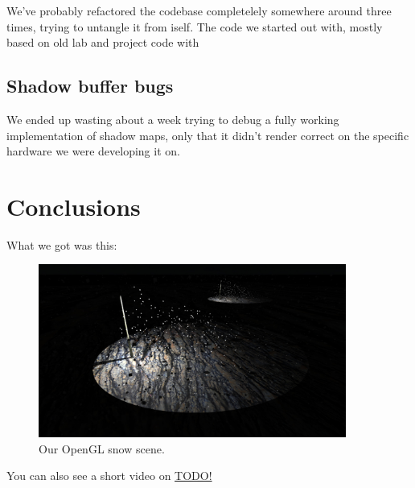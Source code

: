 \documentclass[a4paper,12pt]{article}
\begin{document}
We've probably refactored the codebase completelely somewhere around three times, trying to untangle it from iself. The code we started out with, mostly based on old lab and project code with

\subsection{Shadow buffer bugs}

We ended up wasting about a week trying to debug a fully working implementation of shadow maps, only that it didn't render correct on the specific hardware we were developing it on.


\section{Conclusions}

What we got was this:

\begin{figure}[ht]
  \centering
  \includegraphics[width=0.9\textwidth]{result}
  \caption{\label{fig:label} Our OpenGL snow scene.}
\end{figure}

You can also see a short video on \href{YouTube}{TODO!}
\end{document}
